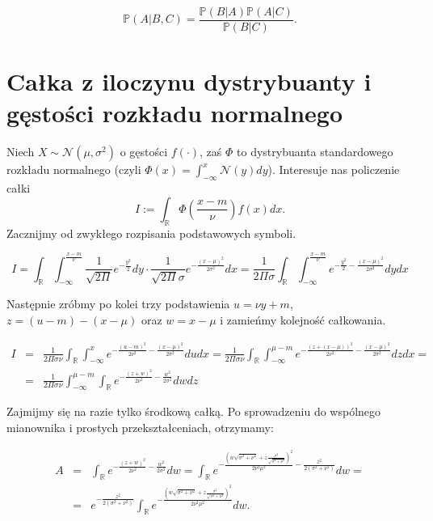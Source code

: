 \documentclass{mini}
\begin{document}
$$
\mathbb{P}(A | B, C) 
=
\frac{
\mathbb{P}(B | A)
\mathbb{P}(A | C)
}{
\mathbb{P}(B | C)
}. 
$$

\section{Całka z iloczynu dystrybuanty i gęstości rozkładu normalnego}\label{app2}

Niech $X \sim \mathcal{N}(\mu, \sigma^2)$ o gęstości $f(\cdot)$, zaś $\Phi$ to dystrybuanta standardowego rozkładu normalnego (czyli $\Phi(x)=\int_{-\infty}^x \mathcal{N}(y) dy$). Interesuje nas policzenie całki
$$
I := \int_\mathbb{R} \Phi(\frac{x-m}{\nu})f(x) dx.
$$
Zacznijmy od zwykłego rozpisania podstawowych symboli.

$$
I = \int_\mathbb{R}\int_{-\infty}^{\frac{x-m}{\nu}} \frac{1}{\sqrt{2\Pi}}e^{-\frac{y^2}{2}} dy \cdot \frac{1}{\sqrt{2\Pi}\sigma}e^{-\frac{(x-\mu)^2}{2\sigma^2}} dx
= 
\frac{1}{2\Pi\sigma}\int_\mathbb{R}\int_{-\infty}^{\frac{x-m}{\nu}} e^{-\frac{y^2}{2} - \frac{(x-\mu)^2}{2\sigma^2}} dy dx
$$

Następnie zróbmy po kolei trzy podstawienia $u = \nu y+m$, $z=(u-m)-(x-\mu)$ oraz $w=x-\mu$ i zamieńmy kolejność całkowania. 

\begin{eqnarray*}
I &=&
\frac{1}{2\Pi\sigma\nu}\int_\mathbb{R}\int_{-\infty}^{x} e^{-\frac{(u-m)^2}{2\nu^2} - \frac{(x-\mu)^2}{2\sigma^2}} du dx
=
\frac{1}{2\Pi\sigma\nu}\int_\mathbb{R}\int_{-\infty}^{\mu-m} e^{-\frac{(z+(x-\mu))^2}{2\nu^2} - \frac{(x-\mu)^2}{2\sigma^2}} dz dx=\\
&=&
\frac{1}{2\Pi\sigma\nu}\int_{-\infty}^{\mu-m}\int_\mathbb{R} e^{-\frac{(z+w)^2}{2\nu^2} - \frac{w^2}{2\sigma^2}} dw dz
\end{eqnarray*}

Zajmijmy się na razie tylko środkową całką. Po sprowadzeniu do wspólnego mianownika i prostych przekształceniach, otrzymamy:

\begin{eqnarray*}
A &=& \int_\mathbb{R} e^{-\frac{(z+w)^2}{2\nu^2} - \frac{w^2}{2\sigma^2}} dw
=
\int_\mathbb{R} e^{-\frac{\left(w\sqrt{\sigma^2+\nu^2} + z\frac{\sigma^2}{\sqrt{\sigma^2+\nu^2}}\right)^2}{2\nu^2\mu^2} - \frac{z^2}{2(\sigma^2+\nu^2)}} dw=\\
&=&
e^{- \frac{z^2}{2(\sigma^2+\nu^2)}}\int_\mathbb{R} e^{-\frac{\left(w\sqrt{\sigma^2+\nu^2} + z\frac{\sigma^2}{\sqrt{\sigma^2+\nu^2}}\right)^2}{2\nu^2\mu^2}} dw.
\end{eqnarray*}
\end{document}
